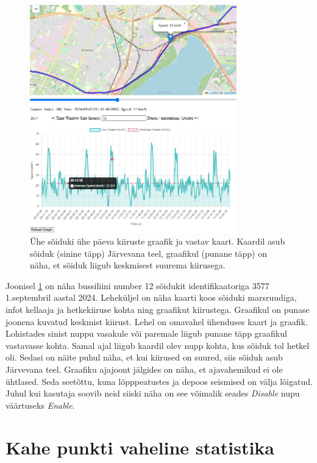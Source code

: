 \begin{figure}[h]
    \centering
    \includegraphics[width=0.8\textwidth]{figures/speedgraphDepos.png}
    \caption{Ühe sõiduki ühe päeva kiiruste graafik ja vastav kaart. Kaardil asub sõiduk (sinine täpp) Järvevana teel, graafikul (punane täpp) on näha, et sõiduk liigub keskmisest suurema kiirusega.}
    \label{fig:KiirusedGraafik}
\end{figure}

Joonisel \ref{fig:KiirusedGraafik} on näha bussiliini number 12 sõidukit identifikaatoriga 3577 1.septembril aastal 2024. Leheküljel on näha kaarti koos sõiduki marsruudiga, infot kellaaja ja hetkekiiruse kohta ning graafikut kiirustega. Graafikul on punase joonena kuvatud keskmist kiirust. 
Lehel on omavahel ühenduses kaart ja graafik. Lohistades sinist nuppu vasakule või paremale liigub punane täpp graafikul vastavasse kohta. Samal ajal liigub kaardil olev nupp kohta, kus sõiduk tol hetkel oli. Sedasi on näite puhul näha, et kui kiirused on suured, siis sõiduk asub Järvevana teel. Graafiku ajajoont jälgides on näha, et ajavahemikud ei ole ühtlased. Seda seetõttu, kuna lõpppeatustes ja depoos seismised on välja lõigatud. Juhul kui kasutaja soovib neid siiski näha on see võimalik seades \textit{Disable} nupu väärtuseks \textit{Enable}.


\section{Kahe punkti vaheline statistika} 

